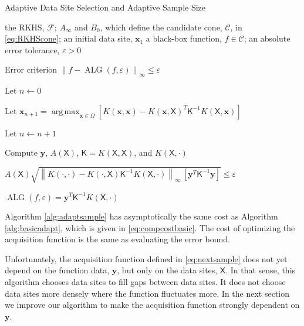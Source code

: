 \documentclass[]{mcom-l}
\theoremstyle{remark}
\DeclareMathOperator*{\argmax}{arg\,max}
\DeclareMathOperator{\ALG}{ALG}
\newcommand{\mK}{\mathsf{K}}
\newcommand{\mX}{\mathsf{X}}
\newcommand{\bx}{{\boldsymbol{x}}}
\newcommand{\by}{{\boldsymbol{y}}}
\newcommand{\cc}{\mathcal{C}}
\newcommand{\calf}{{\mathcal{F}}}
\newcommand{\norm}[2][{}]{\ensuremath{\left \lVert #2 \right \rVert}_{#1}}
\begin{document}
\begin{algorithm}[H]
	\caption{Adaptive Data Site Selection and Adaptive Sample Size \label{alg:adaptsample}}
	\begin{algorithmic}
		\PARAM the RKHS, $\calf$; $A_\infty$ and $B_0$, which define  the candidate cone, $\cc$, in \eqref{eq:RKHScone}; an initial data site, $\bx_1$
		\INPUT a black-box function, $f \in \cc$; an absolute error tolerance, $\varepsilon>0$
		
		\Ensure Error criterion $\norm[\infty]{f - \ALG(f,\varepsilon)} \le \varepsilon$
		
		\State Let $n \leftarrow 0$
		
		\Repeat
		
		
		\State Let $ \bx_{n+1} = \displaystyle \argmax_{\bx \in \Omega} [K(\bx,\bx) - K(\bx,\mX)^T \mK^{-1} K(\mX,\bx)]$
		
		\EndIf
		
		\State Let $n \leftarrow n + 1$
		
		\State Compute $\by$, $A(\mX)$, $\mK = K(\mX,\mX)$, and $K(\mX,\cdot)$
		
		\Until $A(\mX) \sqrt{\norm[\infty]{K(\cdot,\cdot) - K(\cdot,\mX) \mK^{-1} K(\mX,\cdot)} \, [\by^T \mK^{-1} \by] }  \le \varepsilon$
		
		\RETURN $\ALG(f,\varepsilon) = \by^T \mK^{-1} K(\mX,\cdot)$
		
	\end{algorithmic}
\end{algorithm}

Algorithm \ref{alg:adaptsample} has asymptotically the same cost as Algorithm \ref{alg:basicadapt}, which is given in \eqref{eq:compcostbasic}.  The cost of optimizing the acquisition function is the same as evaluating the error bound.

Unfortunately, the acquisition function defined in \eqref{eq:nextsample} does not yet depend on the function data, $\by$, but only on the data sites, $\mX$.  In that sense, this algorithm chooses data sites to fill gaps between data sites.  It does not choose data sites more densely where the function  fluctuates more.  In the next section we improve our algorithm to make the acquisition function strongly dependent on $\by$.





\end{document}
